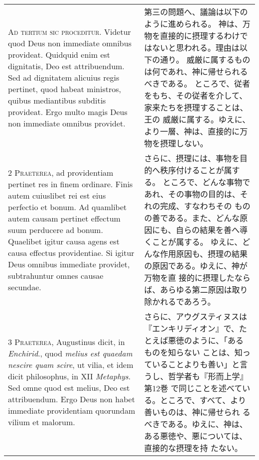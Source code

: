 \documentclass[10pt]{jsarticle} %
\begin{document}
\begin{longtable}{p{21em}p{21em}}

{\Huge A}{\scshape d tertium sic proceditur}. Videtur quod
Deus non immediate omnibus provideat. Quidquid enim est dignitatis, Deo
est attribuendum. Sed ad dignitatem alicuius regis pertinet, quod habeat
ministros, quibus mediantibus subditis provideat. Ergo multo magis Deus
non immediate omnibus providet.

&

 第三の問題へ、議論は以下のように進められる。
 神は、万物を直接的に摂理するわけではないと思われる。理由は以下の通り。
 威厳に属するものは何であれ、神に帰せられるべきである。
 ところで、従者をもち、その従者を介して、家来たちを摂理することは、王の
 威厳に属する。ゆえに、より一層、神は、直接的に万物を摂理しない。
 
\\


2 {\scshape Praeterea}, ad providentiam pertinet res in
finem ordinare. Finis autem cuiuslibet rei est eius perfectio et
bonum. Ad quamlibet autem causam pertinet effectum suum perducere ad
bonum. Quaelibet igitur causa agens est causa effectus providentiae. Si
igitur Deus omnibus immediate providet, subtrahuntur omnes causae
secundae.

&

 さらに、摂理には、事物を目的へ秩序付けることが属する。
 ところで、どんな事物であれ、その事物の目的は、それの完成、すなわちその
 ものの善である。また、どんな原因にも、自らの結果を善へ導くことが属する。
 ゆえに、どんな作用原因も、摂理の結果の原因である。ゆえに、神が万物を直
 接的に摂理したならば、あらゆる第二原因は取り除かれるであろう。

\\


3 {\scshape Praeterea}, Augustinus dicit, in {\itshape Enchirid}.,
quod {\itshape melius est quaedam nescire quam scire}, ut vilia, et idem dicit
philosophus, in XII {\itshape Metaphys}. Sed omne quod est melius, Deo est
attribuendum. Ergo Deus non habet immediate providentiam quorundam
vilium et malorum.

&

 さらに、アウグスティヌスは『エンキリディオン』で、たとえば悪徳のように、「あるものを知らない
 ことは、知っていることよりも善い」と言うし、哲学者も『形而上学』第12巻
 で同じことを述べている。ところで、すべて、より善いものは、神に帰せられ
 るべきである。ゆえに、神は、ある悪徳や、悪については、直接的な摂理を持
 たない。

\\



\end{longtable}
\end{document}
